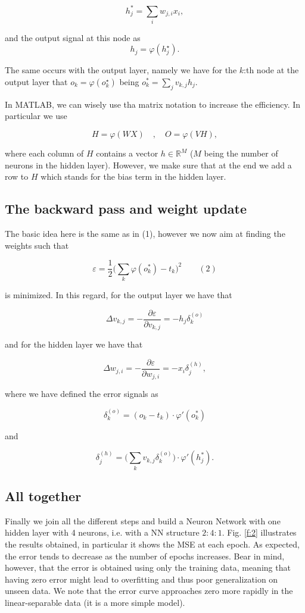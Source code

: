 \documentclass[letterpaper, 10 pt, conference]{ieeeconf}  %
\begin{document}
$$
h_j^\ast = \sum_i w_{j,i} x_i,
$$

and the output signal at this node as 
$$h_j = \varphi(h_j^\star).$$ 

The same occurs with the output layer, namely we have for the $k$:th node at the output layer that $o_k = \varphi(o_k^\star)$ being $o_k^\ast = \sum_j v_{k,j} h_j$.

In MATLAB, we can wisely use tha matrix notation to increase the efficiency. In particular we use

$$
H = \varphi(WX) \quad, \quad O = \varphi(VH),
$$

where each column of $H$ contains a vector $h \in \mathbb{R}^M$ ($M$ being the number of neurons in the hidden layer). However, we make sure that at the end we add a row to $H$ which stands for the bias term in the hidden layer.

\subsection{The backward pass and weight update}
The basic idea here is the same as in (1), however we now aim at finding the weights such that

$$
\varepsilon = \frac{1}{2} \Big(\sum_k \varphi(o_k^\ast) - t_k\Big)^2 \qquad (2)
$$

is minimized. In this regard, for the output layer we have that

$$
\Delta v_{k,j} = - \frac{\partial \varepsilon}{\partial v_{k,j}} = -h_j \delta_k^{(o)}
$$

and for the hidden layer we have that

$$
\Delta w_{j,i} = - \frac{\partial \varepsilon}{\partial w_{j,i}} = -x_i \delta_j^{(h)},
$$ 

where we have defined the error signals as 

$$
\delta_k^{(o)} = (o_k - t_k) \cdot \varphi'(o_k^\ast)
$$

and

$$
\delta_j^{(h)} = \bigg( \sum_k v_{k,j} \delta_k^{(o)} \bigg) \cdot \varphi'(h_j^\ast).
$$

\subsection{All together}
Finally we join all the different steps and build a Neuron Network with one hidden layer with 4 neurons, i.e. with a NN structure $2 : 4 : 1$. Fig. \ref{f:2} illustrates the results obtained, in particular it shows the MSE at each epoch. As expected, the error tends to decrease as the number of epochs increases. Bear in mind, however, that the error is obtained using only the training data, meaning that having zero error might lead to overfitting and thus poor generalization on unseen data. We note that the error curve approaches zero more rapidly in the linear-separable data (it is a more simple model).
\end{document}
